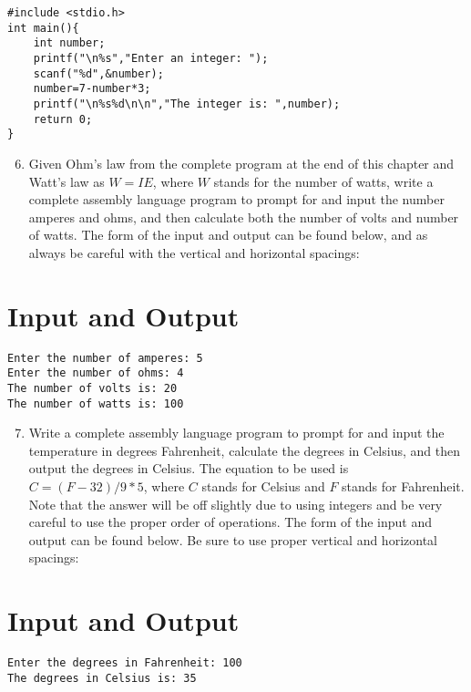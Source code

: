 \documentclass[10pt]{article}
\begin{document}
\begin{verbatim}
#include <stdio.h>
int main(){
    int number;
    printf("\n%s","Enter an integer: ");
    scanf("%d",&number);
    number=7-number*3;
    printf("\n%s%d\n\n","The integer is: ",number);
    return 0;
}
\end{verbatim}

\begin{enumerate}
  \setcounter{enumi}{5}
  \item Given Ohm's law from the complete program at the end of this chapter and Watt's law as $W=I E$, where $W$ stands for the number of watts, write a complete assembly language program to prompt for and input the number amperes and ohms, and then calculate both the number of volts and number of watts. The form of the input and output can be found below, and as always be careful with the vertical and horizontal spacings:
\end{enumerate}

\section*{Input and Output}
\begin{verbatim}
Enter the number of amperes: 5
Enter the number of ohms: 4
The number of volts is: 20
The number of watts is: 100
\end{verbatim}

\begin{enumerate}
  \setcounter{enumi}{6}
  \item Write a complete assembly language program to prompt for and input the temperature in degrees Fahrenheit, calculate the degrees in Celsius, and then output the degrees in Celsius. The equation to be used is $C=(F-32) / 9 * 5$, where $C$ stands for Celsius and $F$ stands for Fahrenheit. Note that the answer will be off slightly due to using integers and be very careful to use the proper order of operations. The form of the input and output can be found below. Be sure to use proper vertical and horizontal spacings:
\end{enumerate}

\section*{Input and Output}
\begin{verbatim}
Enter the degrees in Fahrenheit: 100
The degrees in Celsius is: 35
\end{verbatim}
\end{document}
